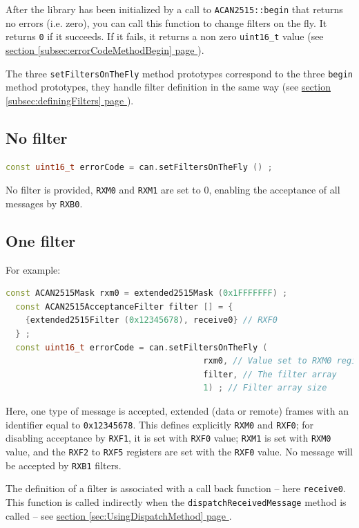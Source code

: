 \documentclass[9pt, a4paper, obeyspaces]{extarticle}
\newcommand\refSectionPage[1]{\hyperref[sec:#1]{section \ref*{sec:#1} page \pageref{sec:#1}}}
\newcommand\refSubsectionPage[1]{\hyperref[subsec:#1]{section \ref*{subsec:#1} page \pageref{subsec:#1}}}
\begin{document}
After the library has been initialized by a call to \texttt{ACAN2515::begin} that returns no errors (i.e. zero), you can call this function to change filters on the fly. It returns \texttt{0} if it succeeds. If it fails, it returns a non zero \texttt{uint16\_t} value (see \refSubsectionPage{errorCodeMethodBegin}).

The three \texttt{setFiltersOnTheFly} method prototypes correspond to the three \texttt{begin} method prototypes, they handle filter definition in the same way (see \refSubsectionPage{definingFilters}).

\subsection{No filter}
{ \small\begin{lstlisting}[language=c++]
  const uint16_t errorCode = can.setFiltersOnTheFly () ;
\end{lstlisting}}
No filter is provided, \texttt{RXM0} and \texttt{RXM1} are set to $0$, enabling the acceptance of all messages by \texttt{RXB0}.



\subsection{One filter}

For example:
{ \small\begin{lstlisting}[language=c++]
  const ACAN2515Mask rxm0 = extended2515Mask (0x1FFFFFFF) ;
  const ACAN2515AcceptanceFilter filter [] = {
    {extended2515Filter (0x12345678), receive0} // RXF0
  } ;
  const uint16_t errorCode = can.setFiltersOnTheFly (
                                        rxm0, // Value set to RXM0 register
                                        filter, // The filter array
                                        1) ; // Filter array size
\end{lstlisting}}

Here, one type of message is accepted, extended (data or remote) frames with an identifier equal to \texttt{0x12345678}. This defines explicitly \texttt{RXM0} and \texttt{RXF0}; for disabling acceptance by \texttt{RXF1}, it is set with \texttt{RXF0} value; \texttt{RXM1} is set with \texttt{RXM0} value, and the \texttt{RXF2} to \texttt{RXF5} registers are set with the \texttt{RXF0} value. No message will be accepted by \texttt{RXB1} filters.

The definition of a filter is associated with a call back function -- here \texttt{receive0}. This function is called indirectly when the \texttt{dispatchReceivedMessage} method is called -- see \refSectionPage{UsingDispatchMethod}.
\end{document}
